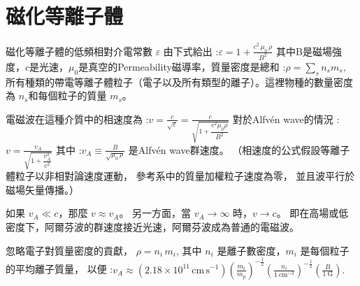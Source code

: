 \documentclass[12pt, a4paper, oneside]{article}
\begin{document}
\begin{spacing}{2.0}
\section{磁化等離子體}
磁化等離子體的低頻相對介電常數 $\varepsilon$ 由下式給出
:$\displaystyle \varepsilon = 1 + \frac{c^2\,\mu_0\,\rho}{B^2}$
其中B是磁場強度，$c$是光速，$\mu_0$是真空的Permeability磁導率，質量密度是總和
:$ \displaystyle\rho = \sum_s n_s m_s ,$
所有種類的帶電等離子體粒子（電子以及所有類型的離子）。這裡物種的數量密度為 $n_s$和每個粒子的質量 $m_s$。

電磁波在這種介質中的相速度為
:$\displaystyle v = \frac{c}{\sqrt{\varepsilon}} = \frac{c}{\sqrt{1 + \dfrac{c^2 \mu_0 \rho}{B^2}}}$
對於Alfvén wave的情況
:$\displaystyle v = \frac{v_A}{\sqrt{1 + \dfrac{v_A^2}{c^2}}}$
其中
:$\displaystyle v_A \equiv \frac{B}{\sqrt{\mu_0\,\rho}}$
是Alfvén wave群速度。
（相速度的公式假設等離子體粒子以非相對論速度運動，
參考系中的質量加權粒子速度為零，
並且波平行於磁場矢量傳播。）

如果 $\displaystyle v_A \ll c$，那麼 $v \approx v_A$。
另一方面，當 $\displaystyle v_A \to \infty$ 時，$v \to c$。 即在高場或低密度下，阿爾芬波的群速度接近光速，阿爾芬波成為普通的電磁波。

忽略電子對質量密度的貢獻，
$\rho = n_i\,m_i$,
其中 $n_i$ 是離子數密度，$m_i$ 是每個粒子的平均離子質量，
以便
:$\displaystyle v_A \approx \left(2.18 \times 10^{11}\,\text{cm}\,\text{s}^{-1}\right) \left(\frac{m_i}{m_p}\right)^{-\frac{1}{2}} \left(\frac{n_i}{1~\text{cm}^{-3}}\right)^{-\frac{1}{2} } \left(\frac{B}{1~\text{G}}\right).$


\section{}










\end{spacing}{}


\end{document}
